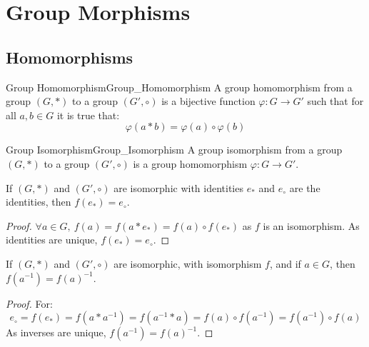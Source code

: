 \section{Group Morphisms}
    \subsection{Homomorphisms}
        \begin{fdefinition}{Group Homomorphism}{Group_Homomorphism}
            A \gls{group homomorphism} from a \gls{group} $(G,*)$ to a group
            $(G',\circ)$ is a \gls{bijective function}
            $\varphi:G\rightarrow{G}'$ such that for all $a,b\in{G}$ it is true
            that:
            \begin{equation*}
                \varphi(a*b)=\varphi(a)\circ\varphi(b)
            \end{equation*}
        \end{fdefinition}
        \begin{fdefinition}{Group Isomorphism}{Group_Isomorphism}
            A \gls{group isomorphism} from a \gls{group} $(G,*)$ to a group
            $(G',\circ)$ is a 
            \gls{group homomorphism} $\varphi:G\rightarrow{G}'$.
        \end{fdefinition}
        \begin{theorem}
            If $(G,*)$ and $(G',\circ)$ are isomorphic with identities $e_{*}$
            and $e_{\circ}$ are the identities, then $f(e_{*})=e_{\circ}$.
        \end{theorem}
        \begin{proof}
            $\forall a\in G,\ f(a)=f(a* e_*) = f(a)\circ f(e_*)$ as $f$ is
            an isomorphism. As identities are unique, $f(e_*)=e_{\circ}$.
        \end{proof}
        \begin{theorem}
            If $(G,*)$ and $(G',\circ)$ are isomorphic, with isomorphism $f$,
            and if $a\in{G}$, then $f(a^{\minus{1}})=f(a)^{\minus{1}}$.
        \end{theorem}
        \begin{proof}
            For:
            \begin{equation}
                e_{\circ}=f(e_*)
                        =f(a*a^{-1})
                        =f(a^{-1}*a)
                        =f(a)\circ f(a^{-1})
                        =f(a^{-1})\circ f(a)
            \end{equation}
            As inverses are unique, $f(a^{-1})=f(a)^{-1}$.
        \end{proof}
